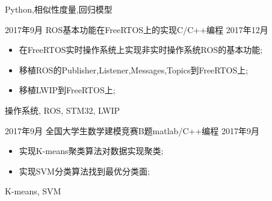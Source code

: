 \begin{experiences}
{\begin{itemize}
  	\end{itemize}
  }
  {Python,相似性度量,回归模型}
  \emptySeparator
	
   \experience
  {2017年9月}   {ROS基本功能在FreeRTOS上的实现}{C/C++编程}{}
  {2017年12月} {
  	\begin{itemize}
  		\item 在FreeRTOS实时操作系统上实现非实时操作系统ROS的基本功能;
  		\item 移植ROS的Publisher,Listener,Messages,Topics到FreeRTOS上;
  		\item 移植LWIP到FreeRTOS上;
  		                                                                               
  	\end{itemize}
  }
  {操作系统, ROS, STM32, LWIP}
  \emptySeparator

  \experience
  {2017年9月}   {全国大学生数学建模竞赛B题}{matlab/C++编程}{}
  {2017年9月} {
    \begin{itemize}
      \item 实现K-means聚类算法对数据实现聚类;
      \item 实现SVM分类算法找到最优分类面;
                                                                                      
      \end{itemize}
  }
  {K-means, SVM}
  \emptySeparator


\end{experiences}
